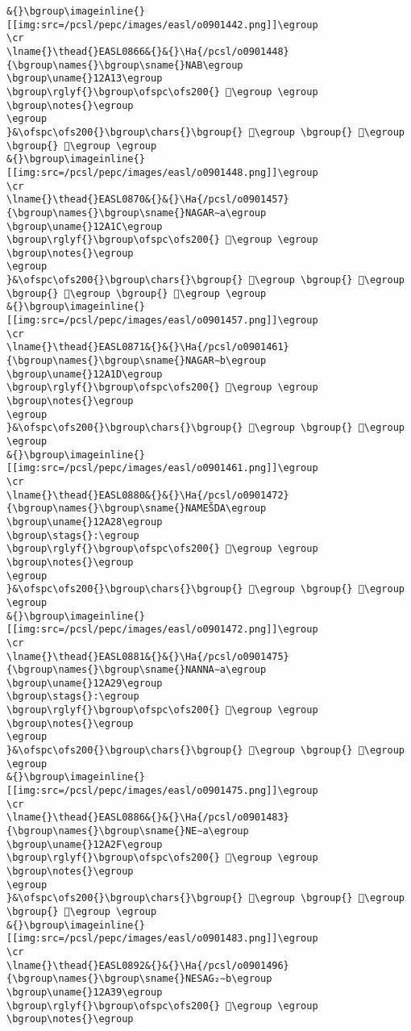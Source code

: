 \begin{verbatim}
&{}\bgroup\imageinline{}[[img:src=/pcsl/pepc/images/easl/o0901442.png]]\egroup
\cr
\lname{}\thead{}EASL0866&{}&{}\Ha{/pcsl/o0901448}{\bgroup\names{}\bgroup\sname{}NAB\egroup
\bgroup\uname{}12A13\egroup
\bgroup\rglyf{}\bgroup\ofspc\ofs200{} 𒨓\egroup \egroup
\bgroup\notes{}\egroup
\egroup
}&\ofspc\ofs200{}\bgroup\chars{}\bgroup{} 𒨓\egroup \bgroup{} 𒨔\egroup \bgroup{} 𒨕\egroup \egroup
&{}\bgroup\imageinline{}[[img:src=/pcsl/pepc/images/easl/o0901448.png]]\egroup
\cr
\lname{}\thead{}EASL0870&{}&{}\Ha{/pcsl/o0901457}{\bgroup\names{}\bgroup\sname{}NAGAR∼a\egroup
\bgroup\uname{}12A1C\egroup
\bgroup\rglyf{}\bgroup\ofspc\ofs200{} 𒨜\egroup \egroup
\bgroup\notes{}\egroup
\egroup
}&\ofspc\ofs200{}\bgroup\chars{}\bgroup{} 𒨙\egroup \bgroup{} 𒨚\egroup \bgroup{} 𒨛\egroup \bgroup{} 𒨜\egroup \egroup
&{}\bgroup\imageinline{}[[img:src=/pcsl/pepc/images/easl/o0901457.png]]\egroup
\cr
\lname{}\thead{}EASL0871&{}&{}\Ha{/pcsl/o0901461}{\bgroup\names{}\bgroup\sname{}NAGAR∼b\egroup
\bgroup\uname{}12A1D\egroup
\bgroup\rglyf{}\bgroup\ofspc\ofs200{} 𒨝\egroup \egroup
\bgroup\notes{}\egroup
\egroup
}&\ofspc\ofs200{}\bgroup\chars{}\bgroup{} 𒨝\egroup \bgroup{} 𒨞\egroup \egroup
&{}\bgroup\imageinline{}[[img:src=/pcsl/pepc/images/easl/o0901461.png]]\egroup
\cr
\lname{}\thead{}EASL0880&{}&{}\Ha{/pcsl/o0901472}{\bgroup\names{}\bgroup\sname{}NAMEŠDA\egroup
\bgroup\uname{}12A28\egroup
\bgroup\stags{}:\egroup
\bgroup\rglyf{}\bgroup\ofspc\ofs200{} 𒨨\egroup \egroup
\bgroup\notes{}\egroup
\egroup
}&\ofspc\ofs200{}\bgroup\chars{}\bgroup{} 𒨧\egroup \bgroup{} 𒨨\egroup \egroup
&{}\bgroup\imageinline{}[[img:src=/pcsl/pepc/images/easl/o0901472.png]]\egroup
\cr
\lname{}\thead{}EASL0881&{}&{}\Ha{/pcsl/o0901475}{\bgroup\names{}\bgroup\sname{}NANNA∼a\egroup
\bgroup\uname{}12A29\egroup
\bgroup\stags{}:\egroup
\bgroup\rglyf{}\bgroup\ofspc\ofs200{} 𒨩\egroup \egroup
\bgroup\notes{}\egroup
\egroup
}&\ofspc\ofs200{}\bgroup\chars{}\bgroup{} 𒨩\egroup \bgroup{} 𒨪\egroup \egroup
&{}\bgroup\imageinline{}[[img:src=/pcsl/pepc/images/easl/o0901475.png]]\egroup
\cr
\lname{}\thead{}EASL0886&{}&{}\Ha{/pcsl/o0901483}{\bgroup\names{}\bgroup\sname{}NE∼a\egroup
\bgroup\uname{}12A2F\egroup
\bgroup\rglyf{}\bgroup\ofspc\ofs200{} 𒨯\egroup \egroup
\bgroup\notes{}\egroup
\egroup
}&\ofspc\ofs200{}\bgroup\chars{}\bgroup{} 𒨯\egroup \bgroup{} 𒨰\egroup \bgroup{} 𒨱\egroup \egroup
&{}\bgroup\imageinline{}[[img:src=/pcsl/pepc/images/easl/o0901483.png]]\egroup
\cr
\lname{}\thead{}EASL0892&{}&{}\Ha{/pcsl/o0901496}{\bgroup\names{}\bgroup\sname{}NESAG₂∼b\egroup
\bgroup\uname{}12A39\egroup
\bgroup\rglyf{}\bgroup\ofspc\ofs200{} 𒨹\egroup \egroup
\bgroup\notes{}\egroup

\end{verbatim}

